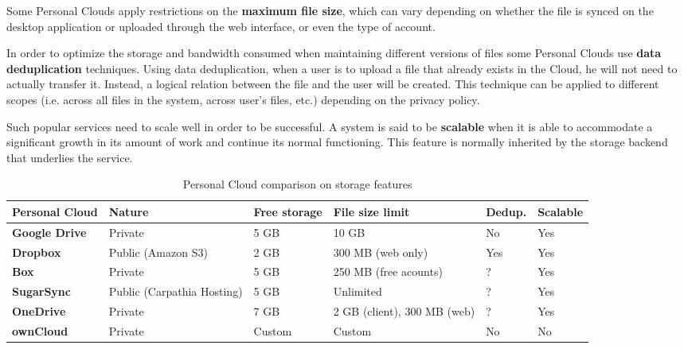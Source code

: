 Some Personal Clouds apply restrictions on the \textbf{maximum file size}, which can vary depending on whether the file is synced on the desktop application or uploaded through the web interface, or even the type of account.

In order to optimize the storage and bandwidth consumed when maintaining different versions of files some Personal Clouds use \textbf{data deduplication} techniques. Using data deduplication, when a user is to upload a file that already exists in the Cloud, he will not need to actually transfer it. Instead, a logical relation between the file and the user will be created. This technique can be applied to different scopes (i.e. across all files in the system, across user's files, etc.) depending on the privacy policy.

Such popular services need to scale well in order to be successful. A system is said to be \textbf{scalable} when it is able to accommodate a significant growth in its amount of work and continue its normal functioning. This feature is normally inherited by the storage backend that underlies the service.

\begin{table}
\begin{center}
    \begin{tabular}{ | p{3cm} | p{1.8cm} | p{1.5cm} | p{2.6cm} | p{1.3cm} | p{1.5cm} | }
    \hline
    \rowcolor[gray]{0.8}

	\textbf{Personal Cloud} &
\textbf{Nature} &
\textbf{Free storage} &
\textbf{File size limit} & 
\textbf{Dedup.} & 
\textbf{Scalable} \\ \hline

	\textbf{Google Drive} &
	Private &
	5 GB &
	10 GB &
	No &
	Yes \\ \hline

	\textbf{Dropbox} &
	Public (Amazon S3) &
	2 GB &
	300 MB (web only) &
	Yes &
	Yes \\ \hline
	
	
	\textbf{Box} &
	Private &
	5 GB & 
	250 MB (free acounts) &
	? &
	Yes \\ \hline
	
	\textbf{SugarSync} & 
	Public (Carpathia Hosting) &
	5 GB &
	Unlimited &
	? &
	Yes \\ \hline
	
	\textbf{OneDrive} & 
	Private &
	7 GB &
	2 GB (client), 300 MB (web) &
	? &
	Yes \\ \hline
	
	\textbf{ownCloud} &
	Private &
	Custom &
	Custom &
	No &
	No \\ \hline

    \end{tabular}
    \\[10pt]
    \caption{Personal Cloud comparison on storage features}
    \label{tab:pc_storage}
\end{center}
\end{table}

